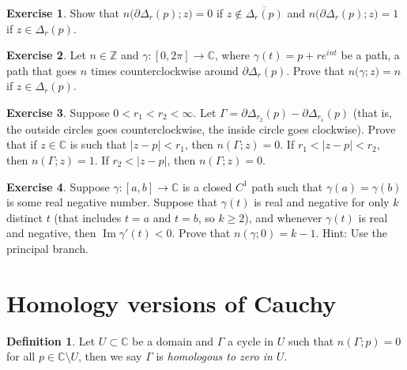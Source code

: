 \documentclass[12pt,openany]{book}
\renewcommand{\Im}{\operatorname{Im}}
\newcommand{\sabs}[1]{\lvert {#1} \rvert}
\newcommand{\C}{{\mathbb{C}}}
\newcommand{\Z}{{\mathbb{Z}}}
\newcommand{\myindex}[1]{#1\index{#1}}
\theoremstyle{plain}
\theoremstyle{remark}
\theoremstyle{definition}
\newtheorem{defn}[thm]{Definition}
\newenvironment{exbox}{%
    \def\FrameCommand{\vrule width 1pt \relax\hspace{10pt}}%
    \MakeFramed{\advance\hsize-\width\FrameRestore}%
}{%
    \endMakeFramed
}
\theoremstyle{exercise}
\newtheorem{exercise}{Exercise}[section]
\theoremstyle{example}
\begin{document}
\begin{exbox}
\begin{exercise}%
\label{exercise:windingcircle}
Show that $n\bigl(\partial \Delta_r(p);z\bigr) = 0$ if $z \notin
\overline{\Delta_r(p)}$ and 
$n\bigl(\partial \Delta_r(p);z\bigr) = 1$ if $z \in \Delta_r(p)$.
\end{exercise}

\begin{exercise}
Let $n \in \Z$ and $\gamma \colon [0,2\pi] \to \C$, where
$\gamma(t) = p + re^{in t}$ be a path, a path that goes $n$ times
counterclockwise around $\partial \Delta_r(p)$.
Prove that
$n\bigl(\gamma;z\bigr) = n$ if $z \in \Delta_r(p)$.
\end{exercise}

\begin{exercise}%
\label{exercise:windingcircles}
Suppose $0 < r_1 < r_2 < \infty$.
Let $\Gamma = \partial \Delta_{r_2}(p) - \partial \Delta_{r_1} (p)$
(that is, the outside circles goes counterclockwise, the inside circle goes
clockwise).
Prove that if $z \in \C$ is such that $\sabs{z-p} < r_1$, then
$n(\Gamma;z) = 0$.  If $r_1 < \sabs{z-p} < r_2$, then
$n(\Gamma;z) = 1$.  If $r_2 < \sabs{z-p}$, then
$n(\Gamma;z) = 0$.
\end{exercise}

\begin{exercise}%
\label{exercise:rayktimes}
Suppose $\gamma \colon [a,b] \to \C$ is a closed $C^1$ path such that
$\gamma(a) = \gamma(b)$ is some real negative number.  Suppose
that $\gamma(t)$ is real and negative for only $k$ distinct $t$ (that
includes $t=a$ and $t=b$, so $k \geq 2$), and whenever $\gamma(t)$ is real and negative,
then $\Im \gamma'(t) < 0$.  Prove that $n(\gamma;0) = k-1$.  Hint: Use
the principal branch.
\end{exercise}
\end{exbox}



\section{Homology versions of Cauchy}

\begin{defn}
Let $U \subset \C$ be a domain and $\Gamma$
a cycle
in $U$
such that $n(\Gamma;p) = 0$ for all $p \in \C \setminus U$,
 then we
say $\Gamma$ is \emph{\myindex{homologous to zero} in $U$}.
\end{defn}
\end{document}
